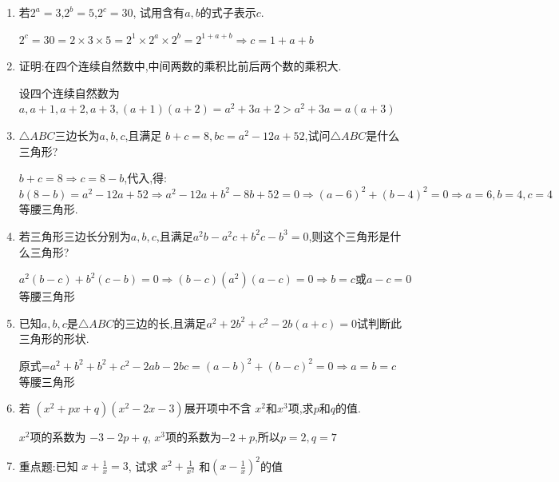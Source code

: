 \documentclass[cn,blue,12pt]{elegantbook}
\begin{document}
    \begin{enumerate}
        \item 若\( 2^a=3\),\(2^b=5\),\(2^c=30\), 试用含有\( a,b \)的式子表示\( c.\)
\begin{solution}
                \(2^c=30=2\times 3\times 5=2^1 \times 2^a \times 2^b = 2^{1+a+b} \Rightarrow c=1+a+b\)\\
\end{solution}
        \item 证明:在四个连续自然数中,中间两数的乘积比前后两个数的乘积大.
\begin{solution}
                设四个连续自然数为\(a,a+1,a+2,a+3, (a+1)(a+2)=a^2+3a+2 > a^2+3a = a(a+3)\)\\
\end{solution}
        \item \(   \triangle ABC \)三边长为\( a,b,c\),且满足  \(b+c=8, bc=a^2-12a+52\),试问\( \triangle ABC \)是什么三角形?
\begin{solution}
    \(b+c=8 \Rightarrow c=8-b\),代入,得:\\
    \(b(8-b)=a^2-12a+52 \Rightarrow a^2-12a+b^2-8b+52=0 \Rightarrow (a-6)^2+(b-4)^2=0 \Rightarrow a=6, b=4, c=4\)\\
    等腰三角形.
\end{solution}
        \item 若三角形三边长分别为\( a, b, c\),且满足\(a^2b-a^2c+b^2c-b^3=0\),则这个三角形是什么三角形?
\begin{solution}
                \(a^2(b-c)+b^2(c-b)=0 \Rightarrow (b-c)(a^2)(a-c)=0\Rightarrow b=c\text{或}a-c=0\)\\
                等腰三角形
\end{solution}
        \item 已知\( a, b, c \)是\( \triangle ABC \)的三边的长,且满足\(a^2+2b^2+c^2-2b(a+c)=0\)试判断此三角形的形状.
\begin{solution}
                原式=\(a^2+b^2+b^2+c^2-2ab-2bc=(a-b)^2+(b-c)^2=0 \Rightarrow a=b=c\)\\
                等腰三角形
\end{solution}
        \item 若 \( (x^2+ px + q)(x^2-2x-3) \)展开项中不含 \(x^2 \text{和} x^3\)项,求\( p \)和\( q \)的值.
\begin{solution}
                \(x^2\)项的系数为 \(-3-2p+q\), \(x^3\)项的系数为\(-2+p\),所以\(p=2,q=7\)
\end{solution}
        \item 重点题:已知 \(x+\frac{1}{x}=3\), 试求 \(x^2+\frac{1}{x^2}\) 和\((x-\frac{1}{x})^2\)的值

\end{enumerate}
\end{document}
